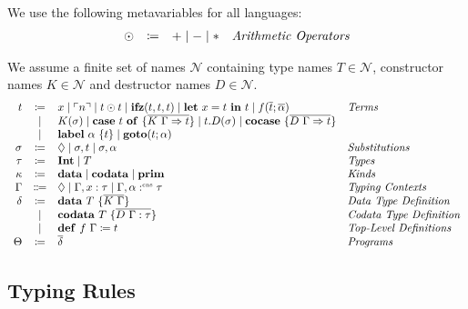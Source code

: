 \begin{definition}
  We use the following metavariables for all languages:
  \[
    \begin{array}{rcll}
      \odot  & \coloneqq & + \mid - \mid * & \emph{Arithmetic Operators}
    \end{array}
  \]
\end{definition}

\begin{definition}
  We assume a finite set of names $\mathcal{N}$ containing type names $T\in\mathcal{N}$, constructor names $K\in\mathcal{N}$ and destructor names $D\in\mathcal{N}$.
  \[ 
    \begin{array}{r c l l}
      t & \coloneqq & x \mid \lit{n} \mid t \odot t \mid \ifz{t}{t}{t} \mid \letin{x}{t}{t} \mid f(\overline{t}; \overline{\alpha}) & \emph{Terms}\\
      & \mid & K(\sigma) \mid \caseof{t}{\overline{K\ \Gamma \Rightarrow t}} \mid t.D(\sigma) \mid \cocase{\overline{D\ \Gamma \Rightarrow t}} & \\
      & \mid & \lab{\alpha}{t} \mid \goto{t}{\alpha} & \\
      \sigma & \coloneqq & \nil \mid \sigma,t \mid \sigma, \alpha & \emph{Substitutions}\\
      \tau & \coloneqq & \tyint \mid T & \emph{Types} \\
      \kappa & \coloneq & \mathbf{data} \mid \mathbf{codata} \mid \mathbf{prim} & \emph{Kinds} \\
      \Gamma & \Coloneqq & \nil \mid \Gamma, x : \tau \mid \Gamma, \alpha \cnt \tau & \emph{Typing Contexts} \\
      \delta & \coloneqq & \mathbf{data}\ T\ \{ \overline{K\ \Gamma} \} & \emph{Data Type Definition}\\
       & \mid & \mathbf{codata}\ T\ \{ \overline{D\ \Gamma : \tau}\} & \emph{Codata Type Definition}\\
       & \mid & \defi{f\ \Gamma}{t} & \emph{Top-Level Definitions}\\
      \Theta & \coloneqq & \overline{\delta} & \emph{Programs}\\
    \end{array}
  \]
\end{definition}

\subsection{Typing Rules}
\label{subsec:fun:typing-rules}


